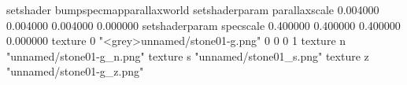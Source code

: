 setshader bumpspecmapparallaxworld
setshaderparam parallaxscale 0.004000 0.004000 0.004000 0.000000
setshaderparam specscale 0.400000 0.400000 0.400000 0.000000
texture 0 "<grey>unnamed/stone01-g.png" 0 0 0 1
texture n "unnamed/stone01-g_n.png"
texture s "unnamed/stone01_s.png"
texture z "unnamed/stone01-g_z.png"